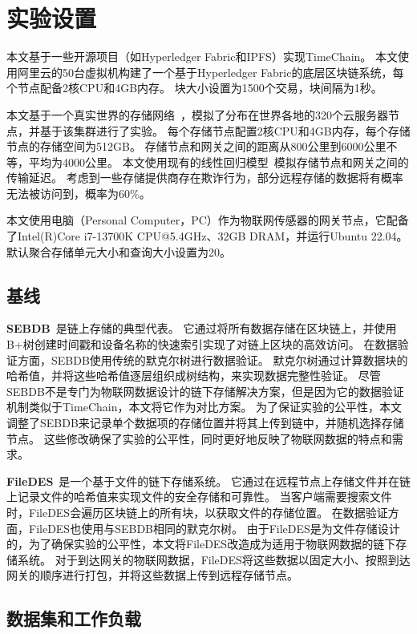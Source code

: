 \section{实验设置}
本文基于一些开源项目（如Hyperledger Fabric和IPFS）实现TimeChain。
本文使用阿里云的50台虚拟机构建了一个基于Hyperledger Fabric的底层区块链系统，每个节点配备2核CPU和4GB内存。
块大小设置为1500个交易，块间隔为1秒。

本文基于一个真实世界的存储网络~\cite{corneo2021surrounded}，模拟了分布在世界各地的320个云服务器节点，并基于该集群进行了实验。
每个存储节点配置2核CPU和4GB内存，每个存储节点的存储空间为512GB。
存储节点和网关之间的距离从800公里到6000公里不等，平均为4000公里。
本文使用现有的线性回归模型~\cite{ziviani2005improving}模拟存储节点和网关之间的传输延迟。
考虑到一些存储提供商存在欺诈行为，部分远程存储的数据将有概率无法被访问到，概率为60\%。

本文使用电脑（Personal Computer，PC）作为物联网传感器的网关节点，它配备了Intel(R)Core i7-13700K CPU@5.4GHz、32GB DRAM，并运行Ubuntu 22.04。
默认聚合存储单元大小和查询大小设置为20。

\subsection{基线}
\textbf{SEBDB}~\cite{zhu2019sebdb}是链上存储的典型代表。
它通过将所有数据存储在区块链上，并使用B+树创建时间戳和设备名称的快速索引实现了对链上区块的高效访问。
在数据验证方面，SEBDB使用传统的默克尔树进行数据验证。
默克尔树通过计算数据块的哈希值，并将这些哈希值逐层组织成树结构，来实现数据完整性验证。
尽管SEBDB不是专门为物联网数据设计的链下存储解决方案，但是因为它的数据验证机制类似于TimeChain，本文将它作为对比方案。
为了保证实验的公平性，本文调整了SEBDB来记录单个数据项的存储位置并将其上传到链中，并随机选择存储节点。
这些修改确保了实验的公平性，同时更好地反映了物联网数据的特点和需求。

\textbf{FileDES}~\cite{xu2024filedes}是一个基于文件的链下存储系统。
它通过在远程节点上存储文件并在链上记录文件的哈希值来实现文件的安全存储和可靠性。
当客户端需要搜索文件时，FileDES会遍历区块链上的所有块，以获取文件的存储位置。
在数据验证方面，FileDES也使用与SEBDB相同的默克尔树。
由于FileDES是为文件存储设计的，为了确保实验的公平性，本文将FileDES改造成为适用于物联网数据的链下存储系统。
对于到达网关的物联网数据，FileDES将这些数据以固定大小、按照到达网关的顺序进行打包，并将这些数据上传到远程存储节点。

\subsection{数据集和工作负载}

